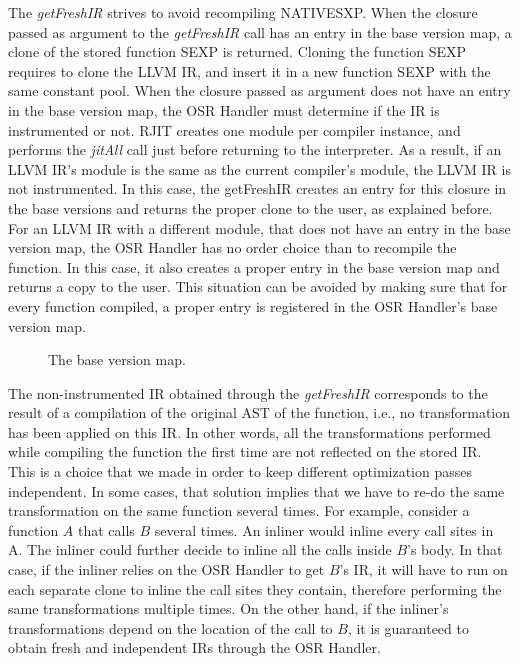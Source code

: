 The \textit{getFreshIR} strives to avoid recompiling NATIVESXP.
When the closure passed as argument to the \textit{getFreshIR} call has an entry in the base version map, a clone of the stored function SEXP is returned.
Cloning the function SEXP requires to clone the LLVM IR, and insert it in a new function SEXP with the same constant pool.
When the closure passed as argument does not have an entry in the base version map, the OSR Handler must determine if the IR is instrumented or not.
RJIT creates one module per compiler instance, and performs the \textit{jitAll} call just before returning to the interpreter.
As a result, if an LLVM IR's module is the same as the current compiler's module, the LLVM IR is not instrumented.
In this case, the getFreshIR creates an entry for this closure in the base versions and returns the proper clone to the user, as explained before.
For an LLVM IR with a different module, that does not have an entry in the base version map, the OSR Handler has no order choice than to recompile the function.
In this case, it also creates a proper entry in the base version map and returns a copy to the user.
This situation can be avoided by making sure that for every function compiled, a proper entry is registered in the OSR Handler's base version map.\\

\begin{figure}[h]
\caption{The base version map.}
\label{fig:baseversionmap}
\end{figure}

The non-instrumented IR obtained through the \textit{getFreshIR} corresponds to the result of a compilation of the original AST of the function, i.e., no transformation has been applied on this IR. 
In other words, all the transformations performed while compiling the function the first time are not reflected on the stored IR. 
This is a choice that we made in order to keep different optimization passes independent.
In some cases, that solution implies that we have to re-do the same transformation on the same function several times.
For example, consider a function $A$ that calls $B$ several times.
An inliner would inline every call sites in A.
The inliner could further decide to inline all the calls inside $B$'s body.
In that case, if the inliner relies on the OSR Handler to get $B$'s IR, it will have to run on each separate clone to inline the call sites they contain, therefore performing the same transformations multiple times.
On the other hand, if the inliner's transformations depend on the location of the call to $B$, it is guaranteed to obtain fresh and independent IRs through the OSR Handler.\\


